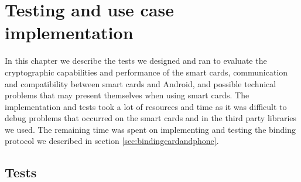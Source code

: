 \chapter{Testing and use case implementation}
\label{ch:testing}
In this chapter we describe the tests we designed and ran to evaluate the cryptographic capabilities and performance of the smart cards, communication and compatibility between smart cards and Android, and possible technical problems that may present themselves when using smart cards. The implementation and tests took a lot of resources and time as it was difficult to debug problems that occurred on the smart cards and in the third party libraries we used. The remaining time was spent on implementing and testing the binding protocol we described in section \ref{sec:bindingcardandphone}.



\section{Tests}








